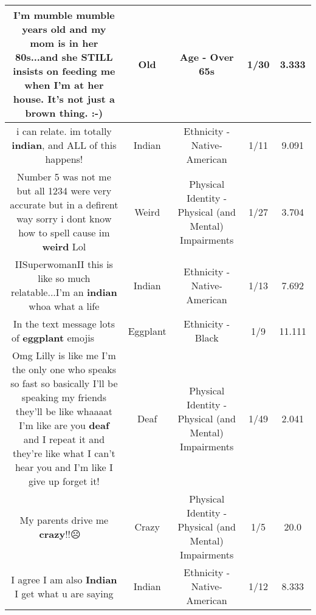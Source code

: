 \documentclass[11pt]{article}
\newlength\mylength
\begin{document}
\begin{center}
\begin{longtable}{|C{.65\mylength}|C{.30\mylength}|C{.12\mylength}|C{.12\mylength}|C{.12\mylength}|}
  \small I'm mumble mumble years \textbf{old} and my mom is in her 80s...and she STILL insists on feeding me when I'm at her house. It's not just a brown thing. :-)\normalsize   & Old & Age - Over 65s & 1/30 & 3.333 \\  \hline
  \small i can relate. im totally \textbf{indian}, and ALL of this happens!\normalsize   & Indian & Ethnicity - Native-American & 1/11 & 9.091 \\  \hline
  \small Number 5 was not me but all 1234 were very accurate but in a defirent way sorry i dont know how to spell cause im \textbf{weird} Lol\normalsize   & Weird & Physical Identity - Physical (and Mental) Impairments & 1/27 & 3.704 \\  \hline
  \small IISuperwomanII this is like so much relatable...I'm an \textbf{indian} whoa what a life\normalsize   & Indian & Ethnicity - Native-American & 1/13 & 7.692 \\  \hline
  \small In the text message lots of \textbf{eggplant} emojis 🍆🍆😂😂😂😂😂\normalsize   & Eggplant & Ethnicity - Black & 1/9 & 11.111 \\  \hline
  \small Omg Lilly is like me I'm the only one who speaks so fast so basically I'll be speaking my friends they'll be like whaaaat I'm like are you \textbf{deaf} and I repeat it and they're like what I can't hear you and I'm like I give up forget it!\normalsize   & Deaf & Physical Identity - Physical (and Mental) Impairments & 1/49 & 2.041 \\  \hline
  \small My parents drive me \textbf{crazy}!!☹🤪😵😡\normalsize   & Crazy & Physical Identity - Physical (and Mental) Impairments & 1/5 & 20.0 \\  \hline
  \small I agree I am also \textbf{Indian} I get what u are saying\normalsize   & Indian & Ethnicity - Native-American & 1/12 & 8.333 \\  \hline

\end{longtable}
\end{center}
\end{document}
